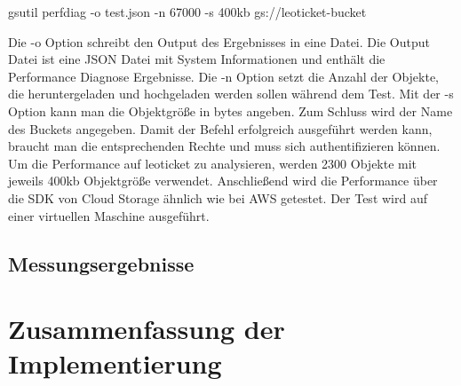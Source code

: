 \begin{code} gsutil perfdiag -o test.json -n 67000 -s 400kb gs://leoticket-bucket \end{code}

Die -o Option schreibt den Output des Ergebnisses in eine Datei. Die Output Datei ist eine JSON Datei mit System Informationen und enthält die Performance Diagnose Ergebnisse. Die -n Option setzt die Anzahl der Objekte, die heruntergeladen und hochgeladen werden sollen während dem Test. Mit der -s Option kann man die Objektgröße in bytes angeben. Zum Schluss wird der Name des Buckets angegeben. Damit der Befehl erfolgreich ausgeführt werden kann, braucht man die entsprechenden Rechte und muss sich authentifizieren können.\\

Um die Performance auf leoticket zu analysieren, werden 2300 Objekte mit jeweils 400kb Objektgröße verwendet. Anschließend wird die Performance über die SDK von Cloud Storage ähnlich wie bei AWS getestet. Der Test wird auf einer virtuellen Maschine ausgeführt. 

\newpage

\subsection{Messungsergebnisse}

\section{Zusammenfassung der Implementierung}